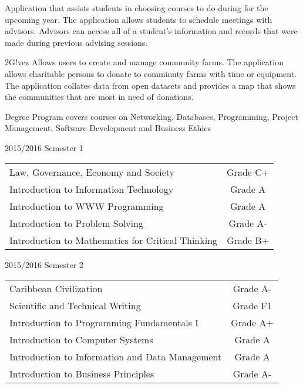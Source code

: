 \documentclass[10pt,a4paper]{altacv}
\begin{document}
\divider

Application that assists students in choosing courses to do during for the upcoming year. The application allows 
students to schedule meetings with advisors. Advisors can access all of a student's information and records that were made
during previous advising sessions.\\

\divider

2G!vez Allows users to create and manage community farms. The application allows charitable persons to donate to comminuty farms with time or equipment. The application collates data from open datasets and provides a map that shows the communities that are most in need of donations.\\
\medskip

\clearpage



Degree Program covers courses on Networking, Databases, Programming, Project Management, Software Development and Business Ethics

\medskip

2015/2016 Semester 1

\medskip
\begin{tabular}{ l c }
Law, Governance, Economy and Society &  Grade C+\\
Introduction to Information Technology  & Grade A\\
Introduction to WWW Programming & Grade A\\
Introduction to Problem Solving & Grade A-\\
Introduction to Mathematics for Critical Thinking & Grade B+
\end{tabular}

\divider

2015/2016 Semester 2

\medskip
\begin{tabular}{ l c }
Caribbean Civilization &  Grade A-\\
Scientific and Technical Writing  & Grade F1\\
Introduction to Programming Fundamentals I & Grade A+\\
Introduction to Computer Systems & Grade A\\
Introduction to Information and Data Management & Grade A\\
Introduction to Business Principles & Grade A-
\end{tabular}
\end{document}
